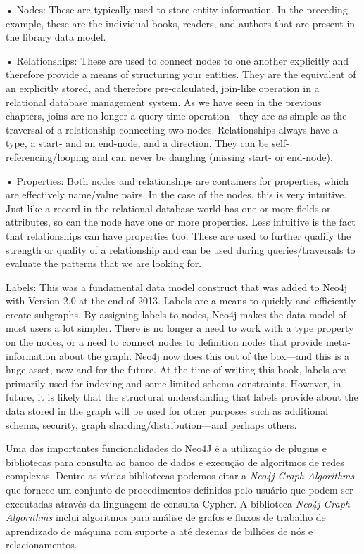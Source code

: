 •   Nodes: These are typically used to store entity information. In the preceding
example, these are the individual books, readers, and authors that are present
in the library data model.

•	 Relationships: These are used to connect nodes to one another explicitly
and therefore provide a means of structuring your entities. They are the
equivalent of an explicitly stored, and therefore pre-calculated, join-like
operation in a relational database management system. As we have seen
in the previous chapters, joins are no longer a query-time operation—they
are as simple as the traversal of a relationship connecting two nodes.
Relationships always have a type, a start- and an end-node, and a direction.
They can be self-referencing/looping and can never be dangling (missing
start- or end-node).

•	 Properties: Both nodes and relationships are containers for properties,
which are effectively name/value pairs. In the case of the nodes, this is
very intuitive. Just like a record in the relational database world has one or
more fields or attributes, so can the node have one or more properties. Less
intuitive is the fact that relationships can have properties too. These are used
to further qualify the strength or quality of a relationship and can be used
during queries/traversals to evaluate the patterns that we are looking for.

 Labels: This was a fundamental data model construct that was added to
Neo4j with Version 2.0 at the end of 2013. Labels are a means to quickly and
efficiently create subgraphs. By assigning labels to nodes, Neo4j makes the
data model of most users a lot simpler. There is no longer a need to work
with a type property on the nodes, or a need to connect nodes to definition
nodes that provide meta-information about the graph. Neo4j now does
this out of the box—and this is a huge asset, now and for the future. At
the time of writing this book, labels are primarily used for indexing and
some limited schema constraints. However, in future, it is likely that the
structural understanding that labels provide about the data stored in the
graph will be used for other purposes such as additional schema, security,
graph sharding/distribution—and perhaps others.


Uma das importantes funcionalidades do Neo4J é a utilização de plugins e bibliotecas para consulta ao banco de dados e execução de algoritmos de redes complexas. 
Dentre as várias bibliotecas podemos citar a \emph{Neo4j Graph Algorithms} que fornece um conjunto de procedimentos definidos pelo usuário que podem ser executadas através da linguagem de consulta Cypher.  
A biblioteca \emph{Neo4j Graph Algorithms} inclui algoritmos para análise de grafos e fluxos de trabalho de aprendizado de máquina com suporte a até dezenas de bilhões de nós e relacionamentos.

